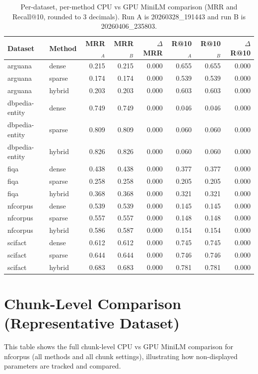 \documentclass[twoside, 11pt]{article}
\begin{document}
\begin{table}[H]
\centering
\caption{Per-dataset, per-method CPU vs GPU MiniLM comparison (MRR and Recall@10, rounded to 3 decimals). Run A is 20260328\_191443 and run B is 20260406\_235803.}
\label{tab:appendix_dataset_level}
\scriptsize
\begin{tabular}{llrrrrrr}
\toprule
Dataset & Method & MRR$_A$ & MRR$_B$ & $\Delta$MRR & R@10$_A$ & R@10$_B$ & $\Delta$R@10 \\
\midrule
arguana & dense  & 0.215 & 0.215 &  0.000 & 0.655 & 0.655 &  0.000 \\
arguana & sparse & 0.174 & 0.174 &  0.000 & 0.539 & 0.539 &  0.000 \\
arguana & hybrid & 0.203 & 0.203 &  0.000 & 0.603 & 0.603 &  0.000 \\
dbpedia-entity & dense  & 0.749 & 0.749 &  0.000 & 0.046 & 0.046 &  0.000 \\
dbpedia-entity & sparse & 0.809 & 0.809 &  0.000 & 0.060 & 0.060 &  0.000 \\
dbpedia-entity & hybrid & 0.826 & 0.826 &  0.000 & 0.060 & 0.060 &  0.000 \\
fiqa & dense  & 0.438 & 0.438 &  0.000 & 0.377 & 0.377 &  0.000 \\
fiqa & sparse & 0.258 & 0.258 &  0.000 & 0.205 & 0.205 &  0.000 \\
fiqa & hybrid & 0.368 & 0.368 &  0.000 & 0.321 & 0.321 &  0.000 \\
nfcorpus & dense  & 0.539 & 0.539 &  0.000 & 0.145 & 0.145 &  0.000 \\
nfcorpus & sparse & 0.557 & 0.557 &  0.000 & 0.148 & 0.148 &  0.000 \\
nfcorpus & hybrid & 0.586 & 0.587 &  0.000 & 0.154 & 0.154 &  0.000 \\
scifact & dense  & 0.612 & 0.612 &  0.000 & 0.745 & 0.745 &  0.000 \\
scifact & sparse & 0.644 & 0.644 &  0.000 & 0.746 & 0.746 &  0.000 \\
scifact & hybrid & 0.683 & 0.683 &  0.000 & 0.781 & 0.781 &  0.000 \\
\bottomrule
\end{tabular}
\end{table}

\section{Chunk-Level Comparison (Representative Dataset)}
\label{app:chunk_level}
This table shows the full chunk-level CPU vs GPU MiniLM comparison for nfcorpus (all methods and all chunk settings), illustrating how non-displayed parameters are tracked and compared.
\end{document}
